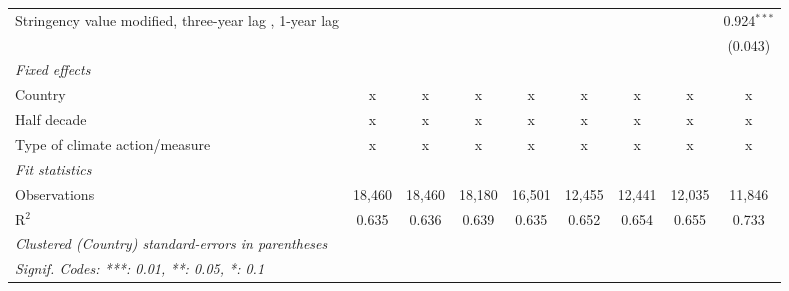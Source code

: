 \begin{table}[htbp]
\begin{tabular}{lcccccccc}
      Stringency value modified, three-year lag , 1-year lag                      &                &               &               &               &               &                &               & 0.924$^{***}$\\   
                                                                                  &                &               &               &               &               &                &               & (0.043)\\   
      \emph{Fixed effects}\\
      Country                                                                     & x              & x             & x             & x             & x             & x              & x             & x\\  
      Half decade                                                                 & x              & x             & x             & x             & x             & x              & x             & x\\  
      Type of climate action/measure                                              & x              & x             & x             & x             & x             & x              & x             & x\\  
      \midrule \emph{Fit statistics}\\
      Observations                                                                & 18,460         & 18,460        & 18,180        & 16,501        & 12,455        & 12,441         & 12,035        & 11,846\\  
      R$^2$                                                                       & 0.635          & 0.636         & 0.639         & 0.635         & 0.652         & 0.654          & 0.655         & 0.733\\  
      \midrule
      \multicolumn{9}{l}{\emph{Clustered (Country) standard-errors in parentheses}}\\
      \multicolumn{9}{l}{\emph{Signif. Codes: ***: 0.01, **: 0.05, *: 0.1}}\\
   \end{tabular}
\end{table}


